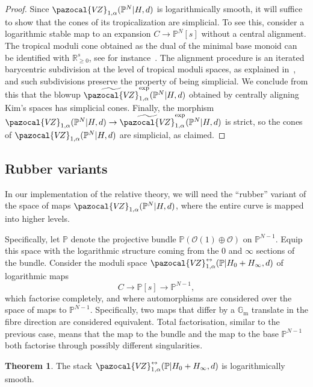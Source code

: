 \documentclass[11pt]{amsart}
\newcommand{\VZ}{\pazocal{V\!Z}}
\renewcommand{\to}{\rightarrow}
\theoremstyle{definition}
\newtheorem{thm}{Theorem}[section]
\theoremstyle{definition}
\begin{document}
\begin{proof}
Since $\VZ_{1,\alpha}(\mathbb P^N|H,d)$ is logarithmically smooth, it will suffice to show that the cones of its tropicalization are simplicial. To see this, consider a logarithmic stable map to an expansion $C\to \mathbb P^N[s]$ without a central alignment. The tropical moduli cone obtained as the dual of the minimal base monoid can be identified with $\mathbb R_{\geq 0}^{s}$, see for instance~\cite[Section~2.2]{ChenDegeneration}. The alignment procedure is an iterated barycentric subdivision at the level of tropical moduli spaces, as explained in~\cite[Section 4.6]{RSPW}, and such subdivisions preserve the property of being simplicial. We conclude from this that the blowup $\widetilde{\VZ}^{\mathrm{exp}}_{1,\alpha}(\mathbb P^N|H,d)$ obtained by centrally aligning Kim's spaces has simplicial cones. Finally, the morphism $\VZ_{1,\alpha}(\mathbb P^N|H,d)\to \widetilde{\VZ}^{\mathrm{exp}}_{1,\alpha}(\mathbb P^N|H,d)$ is strict, so the cones of $\VZ_{1,\alpha}(\mathbb P^N|H,d)$ are simplicial, as claimed.
\end{proof}

\subsection{Rubber variants}\label{subsection rubber} In our implementation of the relative theory, we will need the ``rubber'' variant of the space of maps $
\VZ_{1,\alpha}(\mathbb P^N|H,d)$, where the entire curve is mapped into higher levels. 

Specifically, let $\mathbb P$ denote the projective bundle $\mathbb P(\mathcal O(1)\oplus\mathcal O)$ on $\mathbb P^{N-1}$. Equip this space with the logarithmic structure coming from the $0$ and $\infty$ sections of the bundle. Consider the moduli space $\VZ^{\leftrightarrow}_{1,\alpha}(\mathbb P|H_0+H_\infty,d)$ of logarithmic maps
\[
C\to \mathbb P[s]\to \mathbb P^{N-1},
\]
which factorise completely, and where automorphisms are considered over the space of maps to $\mathbb P^{N-1}$. Specifically, two maps that differ by a $\mathbb G_{\operatorname{m}}$ translate in the fibre direction are considered equivalent. Total factorisation, similar to the previous case, means that the map to the bundle and the map to the base $\mathbb P^{N-1}$ both factorise through possibly different singularities. 

\begin{thm}
The stack $\VZ^{\leftrightarrow}_{1,\alpha}(\mathbb P|H_0+H_\infty,d)$ is logarithmically smooth.
\end{thm}
\end{document}
